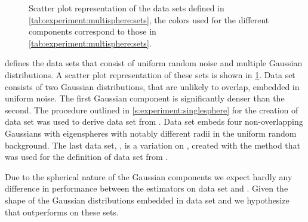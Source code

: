 
\begin{figure}[b]
	\centering
	
	\caption{Scatter plot representation of the data sets defined in \cref{tab:experiment:multisphere:sets}, the colors used for the different components correspond to those in \cref{tab:experiment:multisphere:sets}.}
	\label{fig:experiment:multisphere:sets}
\end{figure}

 defines the data sets that consist of uniform random noise and multiple Gaussian distributions. A scatter plot representation of these sets is shown in \cref{fig:experiment:multisphere:sets}. 
	Data set \ferdosiTwo consists of two Gaussian distributions, that are unlikely to overlap, embedded in uniform noise. The first Gaussian component is significantly denser than the second. 
	The procedure outlined in \cref{s:experiment:singlesphere} for the creation of data set \baakmanOne was used to derive data set \baakmanTwo from \ferdosiTwo.
	Data set \ferdosiThree embeds four non-overlapping Gaussians with eigenspheres with notably different radii in the uniform random background. 
	The last data set, \baakmanThree, is a variation on \ferdosiThree, created with the method that was used for the definition of data set \baakmanOne from \ferdosiOne. 

	Due to the spherical nature of the Gaussian components we expect hardly any difference in performance between the estimators on data set \ferdosiTwo and \ferdosiThree. Given the shape of the Gaussian distributions embedded in data set \baakmanTwo and \baakmanThree we hypothesize that \sambe outperforms \mbe on these sets.